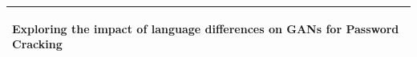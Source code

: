 %
%
%
%
%
\begin{titlepage}
  \addtolength{\hoffset}{0.5\evensidemargin-0.5\oddsidemargin} %
  \noindent%
  \begin{tabular}{@{}p{\textwidth}@{}}
    \toprule[2pt]
    \midrule
    \vspace{0.2cm}
    \begin{center}
    \Huge{\textbf{
      Exploring the impact of language differences on GANs for Password Cracking %
    }}
    \end{center}
    \begin{center}
      \Large{
        
      }
    \end{center}
    \vspace{0.2cm}\\
    \midrule
    \toprule[2pt]
  \end{tabular}
  \vspace{2 cm}
 

\end{titlepage}
